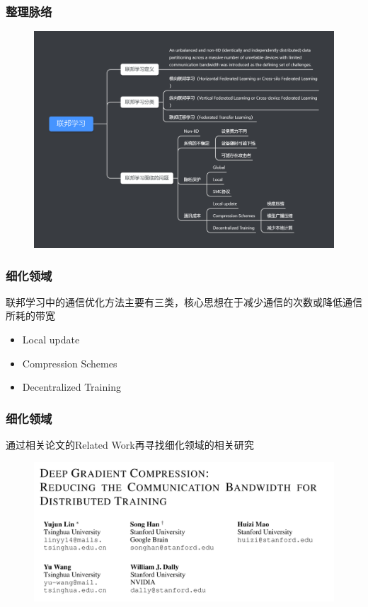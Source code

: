 \documentclass[hyperref={pdfpagelabels=false}]{beamer}
\begin{document}
\begin{frame}
	\frametitle{整理脉络}
	\begin{figure}
		\centering
		\includegraphics[height=0.8\textheight]{./figure/mubu.png}
	\end{figure}
\end{frame}

\begin{frame}
	\frametitle{细化领域}
	联邦学习中的通信优化方法主要有三类，核心思想在于减少通信的次数或降低通信所耗的带宽
	\begin{itemize}
		\item Local update
		\item Compression Schemes
		\item Decentralized Training
	\end{itemize}
\end{frame}

\begin{frame}
	\frametitle{细化领域}
	通过相关论文的Related Work再寻找细化领域的相关研究
	\begin{figure}
		\centering
		\includegraphics[height=0.6\textheight]{./figure/4.png}
	\end{figure}
\end{frame}
\end{document}
